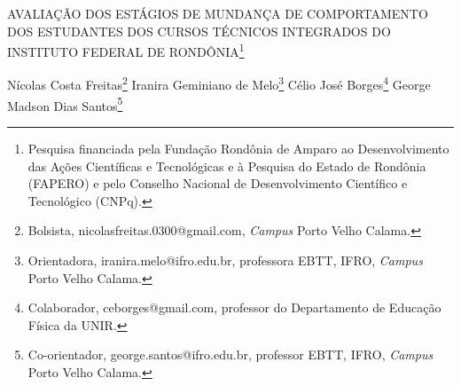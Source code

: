 \documentclass[article,12pt,onesidea,4paper,english,brazil]{abntex2}
\begin{document}
	
	
	\frenchspacing 
	
	\begin{center}
		\LARGE AVALIAÇÃO DOS ESTÁGIOS DE MUNDANÇA DE COMPORTAMENTO DOS
		ESTUDANTES DOS CURSOS TÉCNICOS INTEGRADOS DO INSTITUTO
		FEDERAL DE RONDÔNIA\footnote{Pesquisa financiada pela Fundação Rondônia de Amparo ao Desenvolvimento das Ações Científicas e Tecnológicas e à Pesquisa do Estado de Rondônia (FAPERO) e pelo Conselho Nacional de Desenvolvimento Científico e Tecnológico (CNPq).}
		
		\normalsize
		Nícolas Costa Freitas\footnote{Bolsista, nicolasfreitas.0300@gmail.com, \textit{Campus} Porto Velho Calama.} 
		Iranira Geminiano de Melo\footnote{Orientadora, iranira.melo@ifro.edu.br, professora EBTT, IFRO, \textit{Campus} Porto Velho Calama.} 
		Célio José Borges\footnote{Colaborador, ceborges@gmail.com, professor do Departamento de Educação Física da UNIR.} 
		George Madson Dias Santos\footnote{Co-orientador, george.santos@ifro.edu.br, professor EBTT, IFRO, \textit{Campus} Porto Velho Calama.} 
	\end{center}
	
\end{document}
